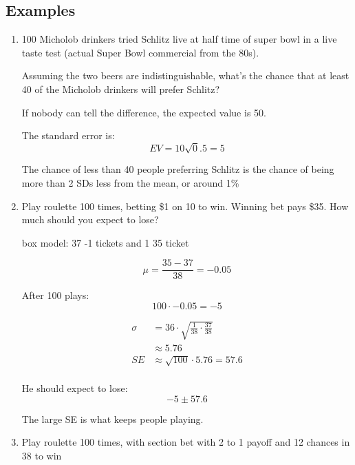\documentclass[letterpaper]{exam}
\begin{document}
  \subsection{Examples}
  \begin{enumerate}
    \item 100 Micholob drinkers tried Schlitz live at half time of super bowl in
      a live taste test (actual Super Bowl commercial from the 80s). 
      
      Assuming the two beers are indistinguishable, what's the chance that at
      least 40 of the Micholob drinkers will prefer Schlitz?

      \begin{solution}
        If nobody can tell the difference, the expected value is 50.

        The standard error is:
        \[
          EV = 10 \sqrt 0.5 = 5
        \]

        The chance of less than 40 people preferring Schlitz is the chance of
        being more than 2 SDs less from the mean, or around 1\%
      \end{solution}

    \item Play roulette 100 times, betting \$1 on 10 to win. Winning bet
      pays \$35. How much should you expect to lose?
      \begin{solution}
        box model: 37 -1 tickets and 1 35 ticket

        \[
          \mu = \frac{35 - 37}{38} = -0.05
        \]

        After 100 plays:
        \[
          100 \cdot -0.05 = -5
        \]

        \begin{align*}
          \sigma & = 36 \cdot \sqrt{\frac{1}{38} \cdot \frac{37}{38}} \\
                 & \approx 5.76 \\
          SE     & \approx \sqrt{100} \cdot 5.76 = 57.6 \\
        \end{align*}

        He should expect to lose:
        \[
          -5 \pm 57.6
        \]

        The large SE is what keeps people playing.

      \end{solution}

    \item Play roulette 100 times, with section bet with 2 to 1 payoff and 12
      chances in 38 to win


\end{enumerate}
\end{document}
